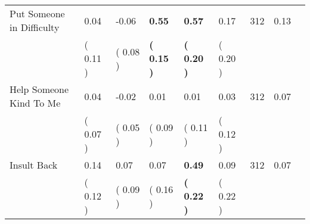 \begin{tabular}{L{6.2cm} C{1.8cm} C{1.8cm} C{1.8cm} C{1.8cm} C{1.8cm} C{1.8cm} C{0.3cm} C{0.3cm}}
Put Someone in Difficulty &      0.04 &     -0.06 & \textbf{     0.55} & \textbf{     0.57} &      0.17  & 312 &       0.13 \\ 
 & (     0.11 ) & (     0.08 ) & \textbf{(     0.15 )} & \textbf{(     0.20 )} & (     0.20 )  & \\
Help Someone Kind To Me &      0.04 &     -0.02 &      0.01 &      0.01 &      0.03  & 312 &       0.07 \\ 
 & (     0.07 ) & (     0.05 ) & (     0.09 ) & (     0.11 ) & (     0.12 )  & \\
Insult Back &      0.14 &      0.07 &      0.07 & \textbf{     0.49} &      0.09  & 312 &       0.07 \\ 
 & (     0.12 ) & (     0.09 ) & (     0.16 ) & \textbf{(     0.22 )} & (     0.22 )  & \\
\bottomrule
\end{tabular}
